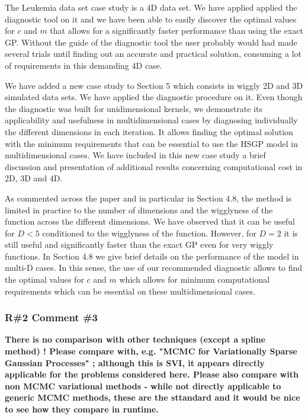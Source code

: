 \documentclass[11pt]{report}
\begin{document}
The Leukemia data set case study is a 4D data set. We have applied applied the diagnostic tool on it and we have been able to easily discover the optimal values for $c$ and $m$ that allows for a significantly faster performance than using the exact GP. Without the guide of the diagnostic tool the user probably would had made several trials until finding out an accurate and practical solution, consuming a lot of requirements in this demanding 4D case.

We have added a new case study to Section 5 which consists in wiggly 2D and 3D simulated data sets. We have applied the diagnostic procedure on it. Even though the diagnostic was built for unidimensional kernels, we demonstrate its applicability and usefulness in multidimensional cases by diagnosing individually the different dimensions in each iteration. It allows finding the  optimal solution with the minimum requirements that can be essential to use the HSGP model in multidimensional cases. We have included in this new case study a brief discussion and presentation of additional results concerning computational cost in 2D, 3D and 4D.

As commented across the paper and in particular in Section 4.8, the method is limited in practice to the number of dimensions and the wigglyness of the function across the different dimensions. We have observed that it can be useful for $D<5$ conditioned to the wigglyness of the function. However, for $D=2$ it is still useful and significantly faster than the exact GP even for very wiggly functions. In Section 4.8 we give brief details on the performance of the model in multi-D cases. In this sense, the use of our recommended diagnostic allows to find the optimal values for $c$ and $m$ which allows for minimum computational requirements which can be essential on these multidimensional cases.

\subsubsection*{R\#2 Comment \#3}

\textbf{There is no comparison with other techniques (except a spline method) ! Please compare with, e.g. "MCMC for Variationally Sparse Gaussian Processes" ; although this is SVI, it appears directly applicable for the problems considered here. Please also compare with non MCMC variational methods - while not directly applicable to generic MCMC methods, these are the sttandard and it would be nice to see how they compare in runtime.}
\end{document}
